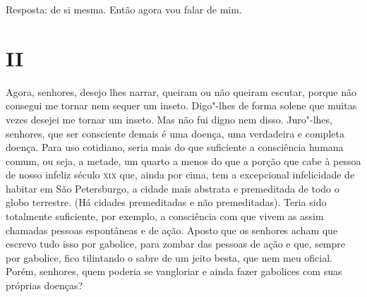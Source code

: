 Resposta: de si mesma. Então agora vou falar de mim.

\section{II}

Agora, senhores, desejo lhes narrar, queiram ou não queiram escutar,
porque não consegui me tornar nem sequer um inseto. Digo"-lhes de forma
solene que muitas vezes desejei me tornar um inseto. Mas não fui digno
nem disso. Juro"-lhes, senhores, que ser consciente demais é uma doença,
uma verdadeira e completa doença. Para uso cotidiano, seria mais do que
suficiente a consciência humana comum, ou seja, a metade, um quarto a
menos do que a porção que cabe à pessoa de nosso infeliz século \textsc{xix} que,
ainda por cima, tem a excepcional infelicidade de habitar em São
Petersburgo, a cidade mais abstrata e premeditada de todo o globo
terrestre. (Há cidades premeditadas e não premeditadas). Teria sido
totalmente suficiente, por exemplo, a consciência com que vivem as assim
chamadas pessoas espontâneas e de ação. Aposto que os senhores acham que
escrevo tudo isso por gabolice, para zombar das pessoas de ação e que,
sempre por gabolice, fico tilintando o sabre de um jeito besta, que nem
meu oficial. Porém, senhores, quem poderia se vangloriar e ainda fazer
gabolices com suas próprias doenças?

